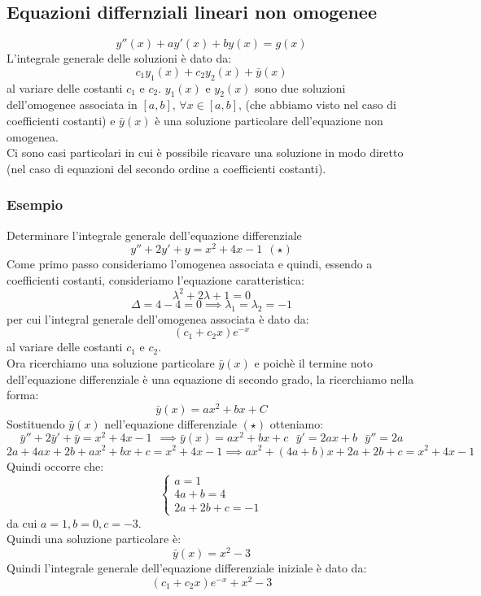 \documentclass[../main.tex]{subfiles}
\begin{document}
\subsection{Equazioni differnziali lineari non omogenee}
\[
    y''(x) + ay'(x) + by(x) = g(x)
\]
L'integrale generale delle soluzioni è dato da:
\[
    c_1y_1(x) + c_2y_2(x) + \bar{y}(x)
\]
al variare delle costanti $c_1$ e $c_2$. $y_1(x)$ e $y_2(x)$ sono due soluzioni
dell'omogenee associata in $[a, b]$, $\forall x \in [a, b]$, (che abbiamo visto
nel caso di coefficienti costanti) e $\bar{y}(x)$ è una soluzione particolare
dell'equazione non omogenea.\\ Ci sono casi particolari in cui è possibile
ricavare una soluzione in modo diretto (nel caso di equazioni del secondo
ordine a coefficienti costanti).

\subsubsection{Esempio}
Determinare l'integrale generale dell'equazione differenziale
\[
    y'' + 2y' + y = x^2+4x-1 \ \ (\star)
\]
Come primo passo consideriamo l'omogenea associata e quindi, essendo a
coefficienti costanti, consideriamo l'equazione caratteristica:
\[
    \lambda^2 + 2\lambda + 1 = 0
\]
\[
    \Delta = 4 - 4 = 0 \implies \lambda_1 = \lambda_2 = -1
\]
per cui l'integral generale dell'omogenea associata è dato da:
\[
    (c_1 + c_2x)e^{-x}
\]
al variare delle costanti $c_1$ e $c_2$.\\ Ora ricerchiamo una soluzione
particolare $\bar{y}(x)$ e poichè il termine noto dell'equazione differenziale
è una equazione di secondo grado, la ricerchiamo nella forma:
\[
    \bar{y}(x) = ax^2 + bx + C
\]
Sostituendo $\bar{y}(x)$ nell'equazione differenziale $(\star)$ otteniamo:
\[
    \bar{y}'' + 2\bar{y}' + \bar{y} =  x^2 + 4x - 1 \ \ \implies \bar{y}(x) = ax^2+bx+c \ \ \ \bar{y}' = 2ax + b \ \ \ \bar{y}'' = 2a
\]
\[
    2a + 4ax + 2b + ax^2 + bx + c = x^2 + 4x - 1 \implies ax^2 + (4a + b)x + 2a + 2b + c = x^2 + 4x - 1
\]
Quindi occorre che:
\[
    \begin{cases}
        a = 1      \\
        4a + b = 4 \\
        2a + 2b + c = -1
    \end{cases}
\]
da cui $a = 1, b = 0, c = -3$.\\ Quindi una soluzione particolare è:
\[
    \bar{y}(x) = x^2 - 3
\]
Quindi l'integrale generale dell'equazione differenziale iniziale è dato da:
\[
    (c_1 + c_2x)e^{-x} + x^2 - 3
\]
\end{document}
